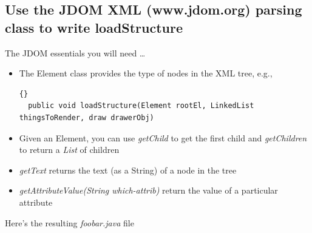 \documentclass[12pt]{article}
\begin{document}
\subsection{Use the JDOM XML (www.jdom.org) parsing class to write loadStructure}

The JDOM essentials you will need \ldots

\begin{itemize}
\item The Element class provides the type of nodes in the XML tree, e.g., 
  \begin{lstlisting}{}
  public void loadStructure(Element rootEl, LinkedList thingsToRender, draw drawerObj)
  \end{lstlisting}
  
\item Given an Element, you can use \textit{getChild} to get the first
  child and \textit{getChildren} to return a \textit{List} of children


\item \textit{getText} returns the text (as a String) of a node in the tree
\item \textit{getAttributeValue(String which-attrib)} return the value of a particular attribute
\end{itemize}

Here's the resulting \textit{foobar.java} file
\end{document}
